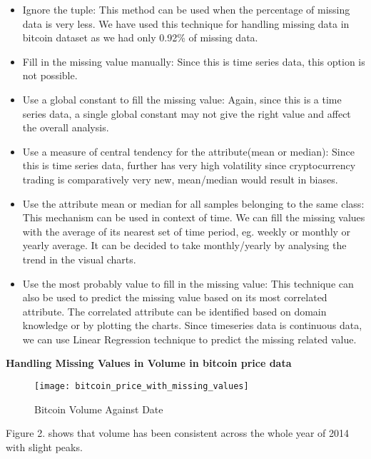 \documentclass{article}
\begin{document}
\begin{itemize}
    \item 
    Ignore the tuple: This method can be used when the percentage of missing data is very less. We have used this technique for handling missing data in bitcoin dataset as we had only 0.92\% of missing data.
    \item
    Fill in the missing value manually: Since this is time series data, this option is not possible.
    
    \item
    Use a global constant to fill the missing value: Again, since this is a time series data, a single global constant may not give the right value and affect the overall analysis.
    
    \item
    Use a measure of central tendency for the attribute(mean or median): Since this is time series data, further has very high volatility since cryptocurrency trading is comparatively very new, mean/median would result in biases.
    
    \item
    Use the attribute mean or median for all samples belonging to the same class: This mechanism can be used in context of time. We can fill the missing values with the average of its nearest set of time period, eg. weekly or monthly or yearly average. It can be decided to take monthly/yearly by analysing the trend in the visual charts.
    
    \item
    Use the most probably value to fill in the missing value: This technique can also be used to predict the missing value based on its most correlated attribute. The correlated attribute can be identified based on domain knowledge or by plotting the charts. Since timeseries data is continuous data, we can use Linear Regression technique to predict the missing related value.
\end{itemize}

\textbf
{Handling Missing Values in Volume in bitcoin price data}


\begin{figure}
    \centering
    \texttt{[image: bitcoin\_price\_with\_missing\_values]}
    \caption{Bitcoin Volume Against Date}
    \label{fig:my_label}
\end{figure}

Figure 2. shows that volume has been consistent across the whole year of 2014 with slight peaks.
\end{document}
